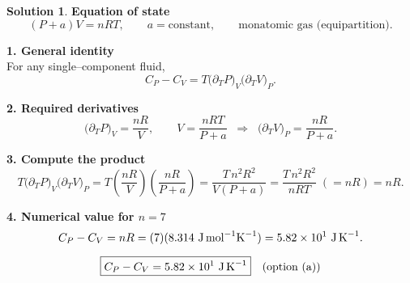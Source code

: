 \documentclass[12pt]{article}
\title{}
\author{Jerich Lee}
\date{\today}
\theoremstyle{definition} %
\newtheorem{solution}{Solution}
\theoremstyle{plain} %
\begin{document}
\maketitle
\begin{solution}
  \textbf{Equation of state}\\[-4pt]
  \[
  (P+a)V=nRT,\qquad a=\text{constant},\qquad\text{monatomic gas (equipartition).}
  \]
  
  \textbf{1. General identity}\\[-4pt]
  For any single–component fluid,
  \[
  C_P-C_V
     =T\bigl(\partial_T P\bigr)_V\bigl(\partial_T V\bigr)_P.
  \]
  
  \textbf{2. Required derivatives}\\[-4pt]
  \[
  \bigl(\partial_T P\bigr)_V
     =\frac{nR}{V},
  \qquad
  V=\frac{nRT}{P+a}
     \;\;\Longrightarrow\;\;
  \bigl(\partial_T V\bigr)_P
     =\frac{nR}{P+a}.
  \]
  
  \textbf{3. Compute the product}\\[-4pt]
  \[
  T\bigl(\partial_T P\bigr)_V\bigl(\partial_T V\bigr)_P
     =T\left(\frac{nR}{V}\right)\left(\frac{nR}{P+a}\right)
     =\frac{T\,n^2R^2}{V(P+a)}
     =\frac{T\,n^2R^2}{\displaystyle nRT}\;(=nR)
     =nR.
  \]
  
  \textbf{4. Numerical value for \(n=7\)}\\[-4pt]
  \[
  C_P-C_V=nR=(7)(8.314\ \text{J\,mol}^{-1}\text{K}^{-1})
          =5.82\times10^{1}\ \text{J\,K}^{-1}.
  \]
  
  \[
  \boxed{C_P-C_V=5.82\times10^{1}\ \text{J\,K}^{-1}}\quad(\text{option (a)})
  \]
  \end{solution}
\end{document}
